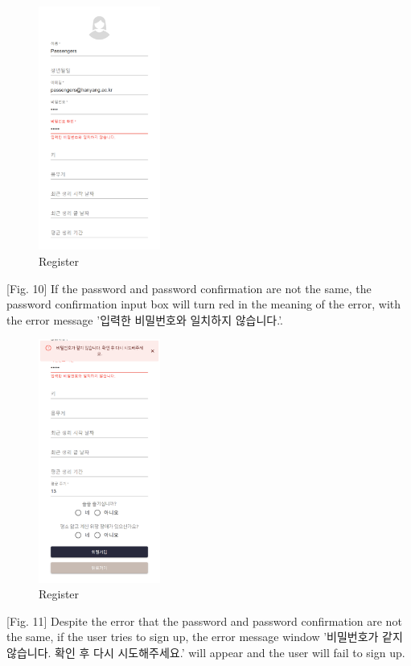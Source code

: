 \documentclass[conference]{IEEEtran}
\begin{document}
\begin{itemize}
    \begin{figure}[htbp]
    \includegraphics[width=4cm, height=8cm, center]{register4.png}
    \caption{Register}
    \label{fig10}
    \end{figure}
    
    [Fig. 10] If the password and password confirmation are not the same, the password confirmation input box will turn red in the meaning of the error, with the error message '입력한 비밀번호와 일치하지 않습니다.'.
    
    \begin{figure}[htbp]
    \includegraphics[width=4cm, height=8cm, center]{sperepass.png}
    \caption{Register}
    \label{fig11}
    \end{figure}
    
    [Fig. 11] Despite the error that the password and password confirmation are not the same, if the user tries to sign up, the error message window '비밀번호가 같지 않습니다. 확인 후 다시 시도해주세요.' will appear and the user will fail to sign up.
    

\end{itemize}
\end{document}
